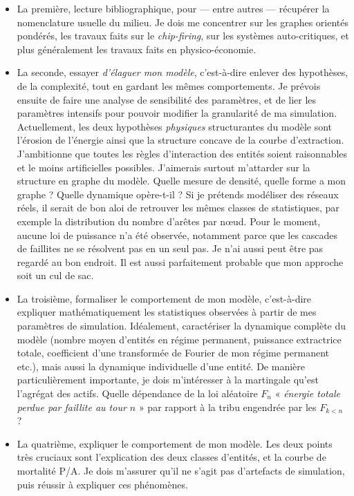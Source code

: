 \documentclass[10pt,a4paper]{article}
\begin{document}
\begin{itemize}
\item La première, lecture bibliographique, pour --- entre autres --- récupérer la nomenclature usuelle du milieu. Je dois me concentrer sur les graphes orientés pondérés, les travaux faits sur le \textit{chip-firing}, sur les systèmes auto-critiques, et plus généralement les travaux faits en physico-économie.
\item La seconde, essayer \textit{d'élaguer mon modèle}, c'est-à-dire enlever des hypothèses, de la complexité, tout en gardant les mêmes comportements. Je prévois ensuite de faire une analyse de sensibilité des paramètres, et de lier les paramètres intensifs pour pouvoir modifier la granularité de ma simulation. Actuellement, les deux hypothèses \textit{physiques} structurantes du modèle sont l'érosion de l'énergie ainsi que la structure concave de la courbe d'extraction. J'ambitionne que toutes les règles d'interaction des entités soient raisonnables et le moins artificielles possibles. J'aimerais surtout m'attarder sur la structure en graphe du modèle. Quelle mesure de densité, quelle forme a mon graphe ? Quelle dynamique opère-t-il ? Si je prétends modéliser des réseaux réels, il serait de bon aloi de retrouver les mêmes classes de statistiques, par exemple la distribution du nombre d'arêtes par nœud. Pour le moment, aucune loi de puissance n'a été observée, notamment parce que les cascades de faillites ne se résolvent pas en un seul pas. Je n'ai aussi peut être pas regardé au bon endroit. Il est aussi parfaitement probable que mon approche soit un cul de sac.
\item La troisième, formaliser le comportement de mon modèle, c'est-à-dire expliquer mathématiquement les statistiques observées à partir de mes paramètres de simulation. Idéalement, caractériser la dynamique complète du modèle (nombre moyen d'entités en régime permanent, puissance extractrice totale, coefficient d'une transformée de Fourier de mon régime permanent etc.), mais aussi la dynamique individuelle d'une entité. De manière particulièrement importante, je dois m'intéresser à la martingale qu'est l'agrégat des actifs. Quelle dépendance de la loi aléatoire $F_n$ « \textit{énergie totale perdue par faillite au tour $n$} » par rapport à la tribu engendrée par les $F_{k<n}$ ?
\item La quatrième, expliquer le comportement de mon modèle. Les deux points très cruciaux sont l'explication des deux classes d'entités, et la courbe de mortalité P/A. Je dois m'assurer qu'il ne s'agit pas d'artefacts de simulation, puis réussir à expliquer ces phénomènes.
\end{itemize}
\end{document}
